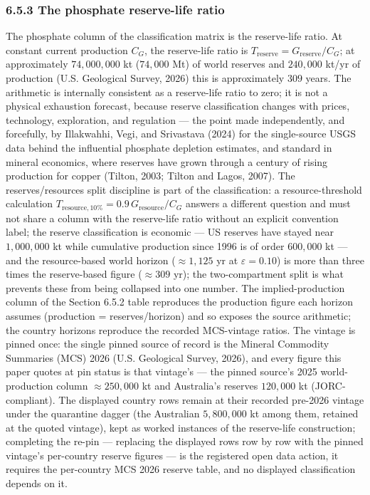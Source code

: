 \documentclass[11pt]{article}
\begin{document}
\subsubsection*{6.5.3 The phosphate reserve-life ratio}\label{653-the-phosphate-reserve-life-ratio}

The phosphate column of the classification matrix is the reserve-life ratio. At constant current production \(C_G\), the reserve-life ratio is \(T_{\mathrm{reserve}} =\allowbreak{} G_{\mathrm{reserve}}/C_G\); at approximately \(74{,}000{,}000\) kt (\(74{,}000\) Mt) of world reserves and \(240{,}000\) kt/\allowbreak{}yr of production (U.S. Geological Survey, 2026) this is approximately \(309\) years. The arithmetic is internally consistent as a reserve-life ratio to zero; it is not a physical exhaustion forecast, because reserve classification changes with prices, technology, exploration, and regulation --- the point made independently, and forcefully, by Illakwahhi, Vegi, and Srivastava (2024) for the single-source USGS data behind the influential phosphate depletion estimates, and standard in mineral economics, where reserves have grown through a century of rising production for copper (Tilton, 2003; Tilton and Lagos, 2007). The reserves/\allowbreak{}resources split discipline is part of the classification: a resource-threshold calculation \(T_{\mathrm{resource},\allowbreak{}10\%} =\allowbreak{} 0.9\,\allowbreak{} G_{\mathrm{resource}}/C_G\) answers a different question and must not share a column with the reserve-life ratio without an explicit convention label; the reserve classification is economic --- US reserves have stayed near \(1{,}000{,}000\) kt while cumulative production since 1996 is of order \(600{,}000\) kt --- and the resource-based world horizon (\(\approx 1{,}125\) yr at \(\varepsilon = 0.10\)) is more than three times the reserve-based figure (\(\approx 309\) yr); the two-compartment split is what prevents these from being collapsed into one number. The implied-production column of the Section 6.5.2 table reproduces the production figure each horizon assumes (production = reserves/\allowbreak{}horizon) and so exposes the source arithmetic; the country horizons reproduce the recorded MCS-vintage ratios. The vintage is pinned once: the single pinned source of record is the Mineral Commodity Summaries (MCS) 2026 (U.S. Geological Survey, 2026), and every figure this paper quotes at pin status is that vintage's --- the pinned source's 2025 world-production column \(\approx 250{,}000\) kt and Australia's reserves \(120{,}000\) kt (JORC-compliant). The displayed country rows remain at their recorded pre-2026 vintage under the quarantine dagger (the Australian \(5{,}800{,}000\) kt among them, retained at the quoted vintage), kept as worked instances of the reserve-life construction; completing the re-pin --- replacing the displayed rows row by row with the pinned vintage's per-country reserve figures --- is the registered open data action, it requires the per-country MCS 2026 reserve table, and no displayed classification depends on it.
\end{document}
